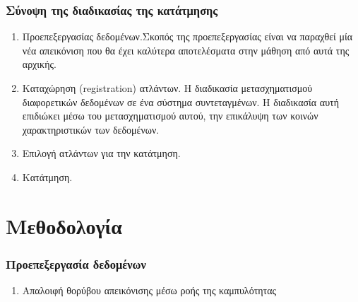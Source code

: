 \documentclass{beamer}
\begin{document}

\begin{frame}
\frametitle{Σύνοψη της διαδικασίας της κατάτμησης}
\begin{enumerate}
    \item<1-> Προεπεξεργασίας δεδομένων.Σκοπός της προεπεξεργασίας είναι να
        παραχθεί μία νέα απεικόνιση που θα έχει καλύτερα αποτελέσματα στην
        μάθηση από αυτά της αρχικής.
    \item<2-> Καταχώρηση (registration) ατλάντων. Η διαδικασία μετασχηματισμού
        διαφορετικών δεδομένων σε ένα σύστημα συντεταγμένων. Η διαδικασία αυτή
        επιδιώκει μέσω του μετασχηματισμού αυτού, την επικάλυψη των κοινών
        χαρακτηριστικών των δεδομένων.
    \item<3-> Επιλογή ατλάντων για την κατάτμηση.
    \item<4-> Κατάτμηση.
\end{enumerate}
\end{frame}

\section{Μεθοδολογία}

\begin{frame}
\frametitle{Προεπεξεργασία δεδομένων}
\begin{enumerate}
    \item<1-> Απαλοιφή θορύβου απεικόνισης μέσω ροής της καμπυλότητας

\end{enumerate}

\end{frame}
\end{document}
